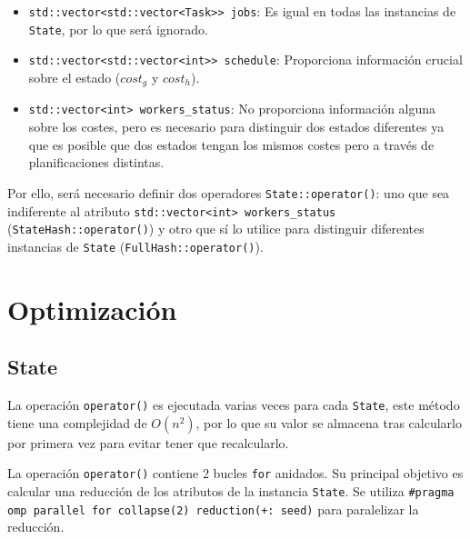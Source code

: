 \begin{itemize}[itemsep=0.25px]
    \item \lstinline{std::vector<std::vector<Task>> jobs}: Es igual en todas las
    instancias de \lstinline{State}, por lo que será ignorado.
    \item \lstinline{std::vector<std::vector<int>> schedule}: Proporciona
    información crucial sobre el estado ($cost_g$ y $cost_h$).
    \item \lstinline{std::vector<int> workers_status}: No proporciona
    información alguna sobre los costes,
    pero es necesario para distinguir dos estados diferentes
    ya que es posible que dos estados tengan los mismos costes pero a través de
    planificaciones distintas.
\end{itemize}

Por ello, será necesario definir dos operadores \lstinline{State::operator()}:
uno que sea indiferente al atributo \lstinline{std::vector<int> workers_status}
(\lstinline{StateHash::operator()})
y otro que sí lo utilice para distinguir diferentes instancias de \lstinline{State}
(\lstinline{FullHash::operator()}).


\section{Optimización}

\subsection{State}

La operación \lstinline{operator()} es ejecutada varias veces para cada
\lstinline{State}, este método tiene una complejidad de $O(n^2)$,
por lo que su valor se almacena tras calcularlo por primera vez
para evitar tener que recalcularlo.

La operación \lstinline{operator()} contiene 2 bucles \lstinline{for} anidados.
Su principal objetivo es calcular una reducción de los atributos de la instancia
\lstinline{State}.
Se utiliza \lstinline{#pragma omp parallel for collapse(2) reduction(+: seed)}
para paralelizar la reducción.

